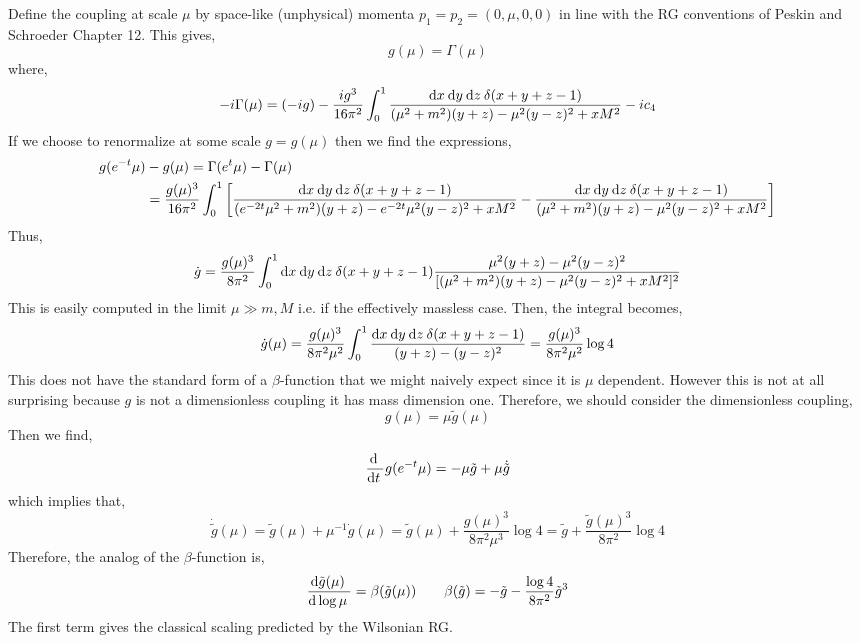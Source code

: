 \documentclass[12pt]{article}
\begin{document}
Define the coupling at scale $\mu$ by space-like (unphysical) momenta $p_1 = p_2 = (0, \mu, 0, 0)$ in line with the RG conventions of Peskin and Schroeder Chapter 12. This gives,
\[  g(\mu) = \Gamma(\mu) \]
where,
\begin{align*}
 - i \Gamma(\mu) = (-ig) - \frac{ig^3}{16 \pi^2} \int_0^1 \frac{\mathrm{d}x \: \mathrm{d}y \: \mathrm{d}z \: \delta(x + y + z - 1) }{(\mu^2 + m^2) (y + z) - \mu^2(y - z)^2 + x M^2} - i c_4
\end{align*}
If we choose to renormalize at some scale $g = g(\mu)$ then we find the expressions,
\begin{align*}
g(e^{-t} \mu)&  - g(\mu) = \Gamma(e^t \mu) - \Gamma(\mu)
\\
& = \frac{g(\mu)^3}{16 \pi^2} \int_0^1  \left[ \frac{\mathrm{d}x \: \mathrm{d}y \: \mathrm{d}z \: \delta(x + y + z - 1) }{(e^{-2t} \mu^2 + m^2) (y + z) - e^{-2t} \mu^2(y - z)^2 + x M^2} -
\frac{\mathrm{d}x \: \mathrm{d}y \: \mathrm{d}z \: \delta(x + y + z - 1) }{(\mu^2 + m^2) (y + z) - \mu^2(y - z)^2 + x M^2}  \right]
\end{align*}
Thus,
\begin{align*}
\dot{g} = \frac{g(\mu)^3}{8 \pi^2} \int_0^1 \mathrm{d}x \: \mathrm{d}y \: \mathrm{d}z \: \delta(x + y + z - 1) \frac{\mu^2(y + z) - \mu^2 (y - z)^2}{[(\mu^2 + m^2) (y + z) - \mu^2(y - z)^2 + x M^2]^2}
\end{align*}
This is easily computed in the limit $\mu \gg m, M$ i.e. if the effectively massless case. Then, the integral becomes, 
\begin{align*}
\dot{g}(\mu) = \frac{g(\mu)^3}{8 \pi^2 \mu^2} \int_0^1  \frac{\mathrm{d}x \: \mathrm{d}y \: \mathrm{d}z \: \delta(x + y + z - 1)}{(y + z) - (y - z)^2} = \frac{g(\mu)^3}{8 \pi^2 \mu^2} \log{4}
\end{align*}
This does not have the standard form of a $\beta$-function that we might naively expect since it is $\mu$ dependent. However this is not at all surprising because $g$ is not a dimensionless coupling it has mass dimension one. Therefore, we should consider the dimensionless coupling,
\[ g(\mu) = \mu \tilde{g}(\mu) \] 
Then we find,
\[ \frac{\mathrm{d} \:}{\mathrm{d}t \:} g(e^{-t} \mu) = - \mu \tilde{g} + \mu \dot{\tilde{g}} \]
which implies that,
\[ \dot{\tilde{g}}(\mu) = \tilde{g}(\mu) + \mu^{-1} \dot{g}(\mu) = \tilde{g}(\mu) + \frac{g(\mu)^3}{8 \pi^2 \mu^3} \log{4} = \tilde{g} + \frac{\tilde{g}(\mu)^3}{8 \pi^2} \log{4} \]
Therefore, the analog of the $\beta$-function is,
\[ 
\frac{\mathrm{d}\tilde{g}(\mu) \:}{\mathrm{d}\log{\mu} \:} = \beta(\tilde{g}(\mu)) \quad \quad \beta(\tilde{g}) = - \tilde{g} - \frac{\log{4}}{8 \pi^2} \tilde{g}^3 
\] 
The first term gives the classical scaling predicted by the Wilsonian RG. 
\end{document}
